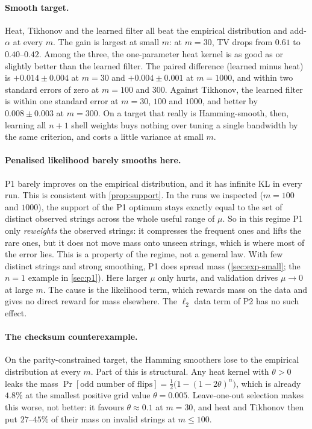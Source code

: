 \paragraph{Smooth target.}
Heat, Tikhonov and the learned filter all beat the empirical distribution and add-$\alpha$ at every $m$. The gain is largest at small $m$: at $m=30$, TV drops from $0.61$ to $0.40$--$0.42$. Among the three, the one-parameter heat kernel is as good as or slightly better than the learned filter. The paired difference (learned minus heat) is $+0.014\pm0.004$ at $m=30$ and $+0.004\pm0.001$ at $m=1000$, and within two standard errors of zero at $m=100$ and $300$. Against Tikhonov, the learned filter is within one standard error at $m=30$, $100$ and $1000$, and better by $0.008\pm0.003$ at $m=300$. On a target that really is Hamming-smooth, then, learning all $n+1$ shell weights buys nothing over tuning a single bandwidth by the same criterion, and costs a little variance at small $m$.

\paragraph{Penalised likelihood barely smooths here.}
P1 barely improves on the empirical distribution, and it has infinite KL in every run. This is consistent with \cref{prop:support}. In the runs we inspected ($m=100$ and $1000$), the support of the P1 optimum stays exactly equal to the set of distinct observed strings across the whole useful range of $\mu$. So in this regime P1 only \emph{reweights} the observed strings: it compresses the frequent ones and lifts the rare ones, but it does not move mass onto unseen strings, which is where most of the error lies. This is a property of the regime, not a general law. With few distinct strings and strong smoothing, P1 does spread mass (\cref{sec:exp-small}; the $n=1$ example in \cref{sec:p1}). Here larger $\mu$ only hurts, and validation drives $\mu\to0$ at large $m$. The cause is the likelihood term, which rewards mass on the data and gives no direct reward for mass elsewhere. The $\ell_2$ data term of P2 has no such effect.

\paragraph{The checksum counterexample.}
On the parity-constrained target, the Hamming smoothers lose to the empirical distribution at every $m$. Part of this is structural. Any heat kernel with $\theta>0$ leaks the mass $\Pr[\text{odd number of flips}]=\tfrac12\bigl(1-(1-2\theta)^{n}\bigr)$, which is already $4.8\%$ at the smallest positive grid value $\theta=0.005$. Leave-one-out selection makes this worse, not better: it favours $\theta\approx0.1$ at $m=30$, and heat and Tikhonov then put $27$--$45\%$ of their mass on invalid strings at $m\le100$.

